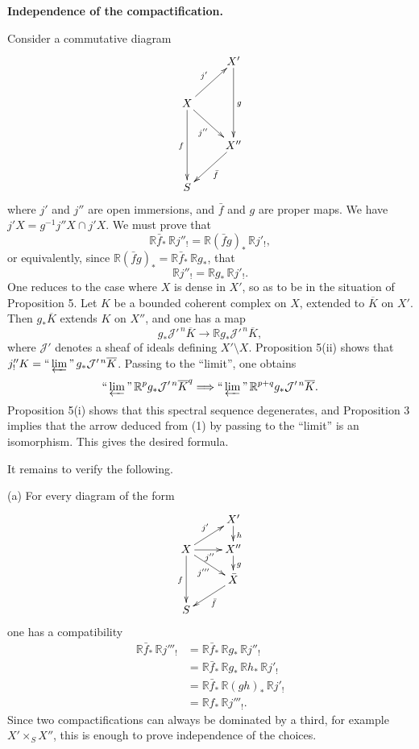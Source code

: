\documentclass[12pt]{amsart}
\theoremstyle{plain}
\theoremstyle{definition}
\newcommand{\cJ}{\mathcal{J}}
\newcommand{\bR}{\mathbb{R}}
\begin{document}
\medskip

\textbf{Independence of the compactification.}

Consider a commutative diagram
\[
\xymatrix{
& X' \ar[dd]^g \\
X \ar[ur]^{j'} \ar[dr]_{j''} \ar[dd]_f & \\
& X'' \ar[dl]^{\bar f} \\
S &
}
\]
where $j'$ and $j''$ are open immersions, and $\bar f$ and $g$ are proper maps. We have $j'X=g^{-1}j''X\cap j'X$. We must prove that
\[
\bR\bar f_*\,\bR j''_!=\bR(\bar f g)_*\,\bR j'_!,
\]
or equivalently, since $\bR(\bar f g)_*=\bR\bar f_*\,\bR g_*$, that
\[
\bR j''_!=\bR g_*\,\bR j'_!.
\]
One reduces to the case where $X$ is dense in $X'$, so as to be in the situation of Proposition 5. Let $K$ be a bounded coherent complex on $X$, extended to $\overline K$ on $X'$. Then $g_*\overline K$ extends $K$ on $X''$, and one has a map
\begin{equation}
g_*\cJ'^{\,n}\overline K\to\bR g_*\cJ'^{\,n}\overline K,
\end{equation}
where $\cJ'$ denotes a sheaf of ideals defining $X'\setminus X$. Proposition 5(ii) shows that $j''_!K=\text{``}\varprojlim\text{''}\,g_*\cJ'^{\,n}\overline K$. Passing to the ``limit'', one obtains
\[
\text{``}\varprojlim\text{''}\,\bR^pg_*\cJ'^{\,n}\overline K^q\Longrightarrow\text{``}\varprojlim\text{''}\,\bR^{p+q}g_*\cJ'^{\,n}\overline K.
\]
Proposition 5(i) shows that this spectral sequence degenerates, and Proposition 3 implies that the arrow deduced from (1) by passing to the ``limit'' is an isomorphism. This gives the desired formula.

It remains to verify the following.

(a) For every diagram of the form
\[
\xymatrix@C=2.4em@R=1.3em{
& X' \ar[d]^{h} \\
X \ar[ur]^{j'} \ar[r]_{j''} \ar[dr]_{j'''} \ar[dd]_{f} & X'' \ar[d]^{g} \\
& \bar X \ar[dl]^{\bar f} \\
S &
}
\]
one has a compatibility
\[
\begin{aligned}
\bR\bar f_*\,\bR j'''_!
&=\bR\bar f_*\,\bR g_*\,\bR j''_! \\
&=\bR\bar f_*\,\bR g_*\,\bR h_*\,\bR j'_! \\
&=\bR\bar f_*\,\bR(gh)_*\,\bR j'_! \\
&=\bR f_*\,\bR j'''_!.
\end{aligned}
\]
Since two compactifications can always be dominated by a third, for example $X'\times_S X''$, this is enough to prove independence of the choices.
\end{document}
